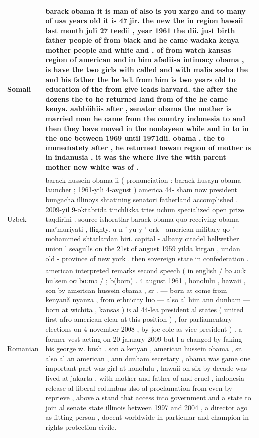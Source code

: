 \documentclass[11pt]{article}
\begin{document}
\begin{center}
\begin{longtable}{|p{1.5cm}|p{13cm}|}
\hline
Somali & {barack obama it is man of also is you xargo and to many of usa years old it is 47 jir. the new the in region hawaii last month juli 27 teedii , year 1961 the dii. just birth father people of from black and he came wadaka kenya mother people and white and , of from watch kansas region of american and in him afadiisa intimacy obama , is have the two girls with called and with malia sasha the and his father the he left from him is two years old to education of the from give leads harvard. the after the dozens the to he returned land from of the he came kenya. aabbiihiis after , senator obama the mother is married man he came from the country indonesia to and then they have moved in the noolayeen while and in to in the one between 1969 until 1971dii. obama , the to immediately after , he returned hawaii region of mother is in indanusia , it was the where live the with parent mother new white was of .}\\
\hline
Uzbek & {barack hussein obama ii ( pronunciation : barack husayn obama launcher ; 1961-yili 4-avgust ) america 44- sham now president bungacha illinoys shtatining senatori fatherland accomplished .  2009-yil 9-oktabrida tinchlikka tries uchun specialized open prize taqdirini . source  ishoratlar  barack obama quo receiving obama maʼmuriyati , flighty. u n ' yu-y ' ork - american military qo ' mohammed shtatlardan biri. capital - albany citadel bellwether union ' seagulls on the 21st of august 1959 yilda kirgan , undan old - province of new york , then sovereign state in confederation .} \\
\hline
Romanian & {american interpreted remarks second speech ( in english / bəˈɹɑːk huˈseɪn oʊˈbɑːmə / ; b(born) . 4 august 1961 , honolulu , hawaii , son by american hussein obama , sr . — born at come from kenyană nyanza , from ethnicity luo — also al him ann dunham — born at wichita , kansas ) is al 44-lea president al states ( united first afro-american clear at this position ) , for parliamentary elections on 4 november 2008 , by joe cole as vice president ) . a former vest acting on 20 january 2009 but l-a changed by faking his george w. bush . son a kenyan , american hussein obama , sr. also al an american , ann dunham secretary , obama was game one important part was girl at honolulu , hawaii on six by decade was lived at jakarta , with mother and father of and cruel , indonesia release al liberal columbus also al proclamation from even by reprieve , above a stand that access into government and a state to join al senate state illinois between 1997 and 2004 , a director ago as fitting person , docent worldwide in particular and champion in rights protection civile.}\\

\end{longtable}
\end{center}
\end{document}
